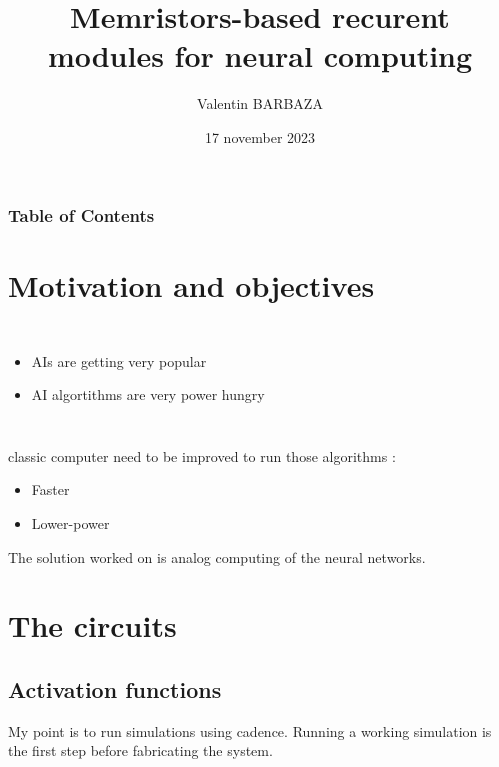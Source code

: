 \documentclass[14pt]{beamer}
\title{Memristors-based recurent modules for neural computing}
\subtitle{}
\author[V. BARBAZA]{{Valentin BARBAZA}}
\date{17 november 2023}
\begin{document}
\frame{\titlepage}

\begin{frame}
  \frametitle{Table of Contents}
  \tableofcontents
\end{frame}

\section{Motivation and objectives}
\begin{frame}{\insertsection}
  \begin{columns}
    \begin{itemize}
      \item AIs are getting very popular
      \item AI algortithms are very power hungry
    \end{itemize}
    
  \end{columns}
\end{frame}

\begin{frame}{\insertsection}
  classic computer need to be improved to run those algorithms :
  \begin{itemize}
    \item Faster
    \item Lower-power
  \end{itemize}
  The solution worked on is analog computing of the neural networks.
\end{frame}

\section{The circuits}
\subsection{Activation functions}
\begin{frame}{\insertsection}{\insertsubsection}
  My point is to run simulations using cadence. Running a working simulation is the first step before fabricating the system.
\end{frame}
\end{document}
